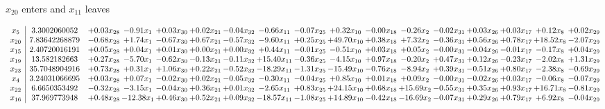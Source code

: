 \documentclass[9pt]{article}
\begin{document}
 $ x_{20} $ enters and $ x_{11} $ leaves 

 \[\begin{array}{c| c c@{\hskip 2pt} c@{\hskip 2pt} c@{\hskip 2pt} c@{\hskip 2pt} c@{\hskip 2pt} c@{\hskip 2pt} c@{\hskip 2pt} c@{\hskip 2pt} c@{\hskip 2pt} c@{\hskip 2pt} c@{\hskip 2pt} c@{\hskip 2pt} c@{\hskip 2pt} c@{\hskip 2pt} c@{\hskip 2pt} }
 x_{5}   &  3.3002060052 & +  0.03 x_{28} & -0.91 x_{1} & +  0.03 x_{30} & +  0.02 x_{21} & -0.04 x_{32} & -0.66 x_{11} & -0.07 x_{25} & +  0.32 x_{10} & -0.00 x_{18} & -0.26 x_{2} & -0.02 x_{31} & +  0.03 x_{26} & +  0.03 x_{17} & +  0.12 x_{8} & +  0.02 x_{29}\\
 x_{20}   &  7.83642268879 & -0.68 x_{28} & +  1.74 x_{1} & -0.67 x_{30} & +  0.67 x_{21} & -0.57 x_{32} & -9.60 x_{11} & +  0.25 x_{25} & + 49.70 x_{10} & +  0.38 x_{18} & +  7.32 x_{2} & -0.36 x_{31} & +  0.56 x_{26} & +  0.78 x_{17} & + 18.52 x_{8} & -2.07 x_{29}\\
 x_{15}   &  2.40720016191 & +  0.05 x_{28} & +  0.04 x_{1} & +  0.01 x_{30} & +  0.00 x_{21} & +  0.00 x_{32} & +  0.44 x_{11} & -0.01 x_{25} & -0.51 x_{10} & +  0.03 x_{18} & +  0.05 x_{2} & -0.00 x_{31} & -0.04 x_{26} & -0.01 x_{17} & -0.17 x_{8} & +  0.04 x_{29}\\
 x_{19}   &  13.582182663 & +  0.27 x_{28} & -5.70 x_{1} & -0.62 x_{30} & -0.13 x_{21} & -0.11 x_{32} & + 15.40 x_{11} & -0.36 x_{25} & -4.15 x_{10} & +  0.97 x_{18} & -0.20 x_{2} & +  0.47 x_{31} & +  0.12 x_{26} & -0.23 x_{17} & -2.02 x_{8} & +  1.31 x_{29}\\
 x_{23}   &  35.7048904916 & +  0.73 x_{28} & +  0.31 x_{1} & +  1.06 x_{30} & +  0.22 x_{21} & -0.52 x_{32} & -18.29 x_{11} & -1.31 x_{25} & -15.49 x_{10} & -0.76 x_{18} & -8.94 x_{2} & +  0.39 x_{31} & -0.51 x_{26} & +  0.80 x_{17} & -2.38 x_{8} & -0.69 x_{29}\\
 x_{4}   &  3.24031066695 & +  0.03 x_{28} & +  0.07 x_{1} & -0.02 x_{30} & +  0.02 x_{21} & -0.05 x_{32} & -0.30 x_{11} & -0.04 x_{25} & +  0.85 x_{10} & +  0.01 x_{18} & +  0.09 x_{2} & -0.00 x_{31} & -0.02 x_{26} & +  0.03 x_{17} & -0.06 x_{8} & -0.07 x_{29}\\
 x_{22}   &  6.6650353492 & -0.32 x_{28} & -3.15 x_{1} & -0.04 x_{30} & +  0.36 x_{21} & +  0.01 x_{32} & -2.65 x_{11} & +  0.83 x_{25} & + 24.15 x_{10} & +  0.68 x_{18} & + 15.69 x_{2} & -0.55 x_{31} & +  0.35 x_{26} & +  0.93 x_{17} & + 16.71 x_{8} & -0.81 x_{29}\\
 x_{16}   &  37.969773948 & +  0.48 x_{28} & -12.38 x_{1} & +  0.46 x_{30} & +  0.52 x_{21} & +  0.09 x_{32} & -18.57 x_{11} & -1.08 x_{25} & + 14.89 x_{10} & -0.42 x_{18} & -16.69 x_{2} & -0.07 x_{31} & +  0.29 x_{26} & +  0.79 x_{17} & +  6.92 x_{8} & -0.04 x_{29}\\

\end{array}\]
\end{document}
